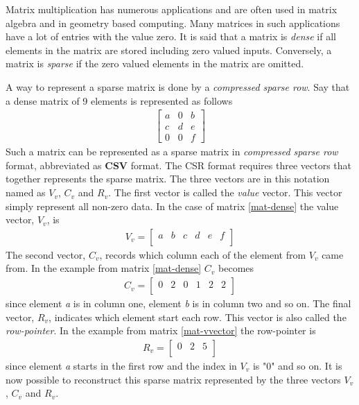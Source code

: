 Matrix multiplication has numerous applications and are often used in matrix algebra and in geometry based computing.
Many matrices in such applications have a lot of entries with the value zero.
It is said that a matrix is \textit{dense} if all elements in the matrix are stored including zero valued inputs.
Conversely, a matrix is \textit{sparse} if the zero valued elements in the matrix are omitted.

A way to represent a sparse matrix is done by a \textit{compressed sparse row}.
Say that a dense matrix of 9 elements is represented as follows
\begin{gather}
	\begin{bmatrix}
		a & 0 & b \\[0.3em]
		c & d & e \\[0.3em]
		0 & 0 & f
	\end{bmatrix}
	\label{mat-dense}
\end{gather}
Such a matrix can be represented as a sparse matrix in \textit{compressed sparse row} format, abbreviated as \textbf{CSV} format.
The CSR format requires three vectors that together represents the sparse matrix.
The three vectors are in this notation named as $V_v$, $C_v$ and $R_v$.
The first vector is called the \textit{value} vector.
This vector simply represent all non-zero data.
In the case of matrix \ref{mat-dense} the value vector, $V_v$, is
\begin{gather}
	V_v =
	\begin{bmatrix}
		a & b & c & d & e & f\\[0.3em]
	\end{bmatrix}
\end{gather}
The second vector, $C_v$, records which column each of the element from $V_v$ came from.
In the example from matrix \ref{mat-dense} $C_v$ becomes
\begin{gather}
	C_v =
	\begin{bmatrix}
		0 & 2 & 0 & 1 & 2 & 2\\[0.3em]
	\end{bmatrix}
	\label{mat-vvector}
\end{gather}
since element \textit{a} is in column one, element \textit{b} is in column two and so on.
The final vector, $R_v$, indicates which element start each row.
This vector is also called the \textit{row-pointer}.
In the example from matrix \ref{mat-vvector} the row-pointer is
\begin{gather}
	R_v =
	\begin{bmatrix}
		0 & 2 & 5\\[0.3em]
	\end{bmatrix}
\end{gather}
since element \textit{a} starts in the first row and the index in $V_v$ is "0" and so on.
It is now possible to reconstruct this sparse matrix represented by the three vectors $V_v$, $C_v$ and $R_v$.

